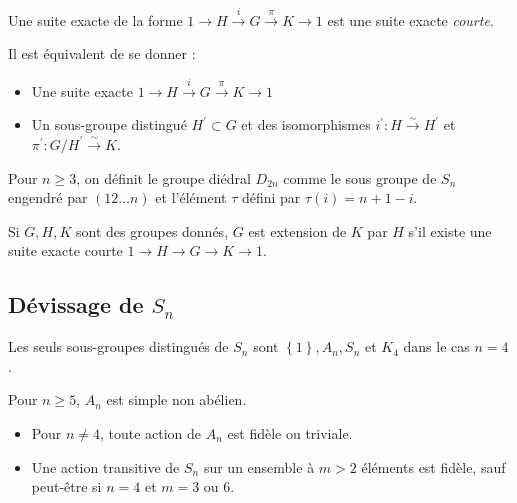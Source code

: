 \documentclass{cours}
\begin{document}
\begin{definition}
    Une suite exacte de la forme $1 \rightarrow H \xrightarrow{i} G \xrightarrow{\pi} K \rightarrow 1$ est une suite exacte \emph{courte}.
\end{definition}

\begin{proposition}
    Il est équivalent de se donner :
    \begin{itemize}
        \item Une suite exacte $1 \rightarrow H \xrightarrow{i} G \xrightarrow{\pi} K \rightarrow 1$
        \item Un sous-groupe distingué $H^{'} \subset G$ et des isomorphismes $i^{'} : H \xrightarrow{\sim} H^{'}$ et $\pi^{'} : G/H^{'} \xrightarrow{\sim} K$.
    \end{itemize}
\end{proposition}

\begin{definition}
    Pour $n\geq 3$, on définit le groupe diédral $D_{2n}$ comme le sous groupe de $S_{n}$ engendré par $(1 2 \ldots n)$ et l'élément $\tau$ défini par $\tau(i) = n+1-i$.
\end{definition}

\begin{definition}
    Si $G, H, K$ sont des groupes donnés, $G$ est extension de $K$ par $H$ s'il existe une suite exacte courte $1\rightarrow H \rightarrow G \rightarrow K \rightarrow 1$.
\end{definition}

\subsection{Dévissage de $S_{n}$}

\begin{theorem}
    Les seuls sous-groupes distingués de $S_{n}$ sont $\left\{1\right\}, A_{n}, S_{n}$ et $K_4$ dans le cas $n = 4$.
\end{theorem}

\begin{theorem}
    Pour $n \geq 5$, $A_{n}$ est simple non abélien.
\end{theorem}

\begin{corollary}
    \begin{itemize}
        \item Pour $n \neq 4$, toute action de $A_{n}$ est fidèle ou triviale.
        \item Une action transitive de $S_{n}$ sur un ensemble à $m > 2$ éléments est fidèle, sauf peut-être si $n=4$ et $m = 3$ ou $6$.
    \end{itemize}
\end{corollary}
\end{document}
